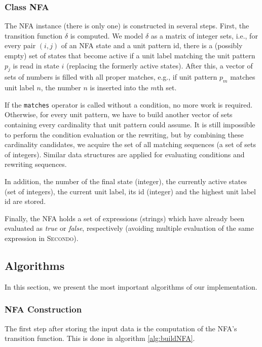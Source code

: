 \documentclass{sig-alternate}
\newcommand{\ic}[1]{\textit{#1}}
\newcommand{\secondo}{\textsc{Secondo}}
\begin{document}
\subsubsection{Class NFA}
The NFA instance (there is only one) is constructed in several steps. First, the transition function $\delta$ is computed. We model $\delta$ as a matrix of integer sets, i.e., for every pair $(i,j)$ of an NFA state and a unit pattern id, there is a (possibly empty) set of states that become active if a unit label matching the unit pattern $p_j$ is read in state $i$ (replacing the formerly active states). After this, a vector of sets of numbers is filled with all proper matches, e.g., if unit pattern $p_m$ matches unit label $n$, the number $n$ is inserted into the $m$th set.

If the \texttt{matches} operator is called without a condition, no more work is required. Otherwise, for every unit pattern, we have to build another vector of sets containing every cardinality that unit pattern could assume. It is still impossible to perform the condition evaluation or the rewriting, but by combining these cardinality candidates, we acquire the set of all matching sequences (a set of sets of integers). Similar data structures are applied for evaluating conditions and rewriting sequences.

In addition, the number of the final state (integer), the currently active states (set of integers), the current unit label, its id (integer) and the highest unit label id are stored.

Finally, the NFA holds a set of expressions (strings) which have already been evaluated as \ic{true} or \ic{false}, respectively (avoiding multiple evaluation of the same expression in \secondo).

\subsection{Algorithms}
\IncMargin{-1mm}
\SetInd{2.5mm}{1.5mm}
\SetNlSkip{2mm}
In this section, we present the most important algorithms of our implementation.

\subsubsection{NFA Construction}
The first step after storing the input data is the computation of the NFA's transition function. This is done in algorithm \ref{alg:buildNFA}.
\end{document}
